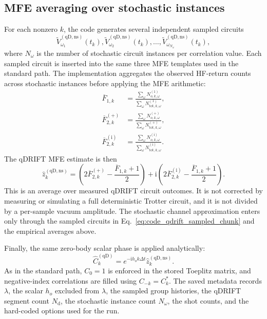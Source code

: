 \documentclass[11pt]{article}
\newcommand{\ii}{\mathrm{i}}
\begin{document}
\subsection{MFE averaging over stochastic instances}

For each nonzero $k$, the code generates several independent sampled circuits
\begin{equation}
    \widetilde{V}^{\mathrm{(qD,ns)}}_{\omega_1}(t_k),
    \widetilde{V}^{\mathrm{(qD,ns)}}_{\omega_2}(t_k),
    \ldots,
    \widetilde{V}^{\mathrm{(qD,ns)}}_{\omega_{N_\omega}}(t_k),
\end{equation}
where $N_\omega$ is the number of stochastic circuit instances per correlation value.  Each sampled circuit is inserted into the same three MFE templates used in the standard path.  The implementation aggregates the observed HF-return counts across stochastic instances before applying the MFE arithmetic:
\begin{align}
    \overline{F}_{1,k}
    &=
    \frac{\sum_{\omega}N^{(1)}_{o,k,\omega}}
         {\sum_{\omega}N^{(1)}_{\mathrm{tot},k,\omega}}, \\
    \overline{F}_{2,k}^{(+)}
    &=
    \frac{\sum_{\omega}N^{(+)}_{o,k,\omega}}
         {\sum_{\omega}N^{(+)}_{\mathrm{tot},k,\omega}}, \\
    \overline{F}_{2,k}^{(\ii)}
    &=
    \frac{\sum_{\omega}N^{(\ii)}_{o,k,\omega}}
         {\sum_{\omega}N^{(\ii)}_{\mathrm{tot},k,\omega}}.
\end{align}
The qDRIFT MFE estimate is then
\begin{equation}
    \widehat{z}^{\mathrm{(qD,ns)}}_k
    =
    \left(2\overline{F}_{2,k}^{(+)}-\frac{\overline{F}_{1,k}+1}{2}\right)
    +
    \ii\left(2\overline{F}_{2,k}^{(\ii)}-\frac{\overline{F}_{1,k}+1}{2}\right).
    \label{eq:code_qdrift_mfe_estimator}
\end{equation}
This is an average over measured qDRIFT circuit outcomes.  It is not corrected by measuring or simulating a full deterministic Trotter circuit, and it is not divided by a per-sample vacuum amplitude.  The stochastic channel approximation enters only through the sampled circuits in Eq.~\eqref{eq:code_qdrift_sampled_chunk} and the empirical averages above.

Finally, the same zero-body scalar phase is applied analytically:
\begin{equation}
    \widehat{C}^{\mathrm{(qD)}}_k
    =
    e^{-\ii h_o k\Delta t}
    \widehat{z}^{\mathrm{(qD,ns)}}_k.
    \label{eq:code_qdrift_scalar_phase}
\end{equation}
As in the standard path, $C_0=1$ is enforced in the stored Toeplitz matrix, and negative-index correlations are filled using $C_{-k}=C_k^*$.  The saved metadata records $\lambda$, the scalar $h_o$ excluded from $\lambda$, the sampled group histories, the qDRIFT segment count $N_{\mathrm{d}}$, the stochastic instance count $N_\omega$, the shot counts, and the hard-coded options used for the run.
\end{document}
